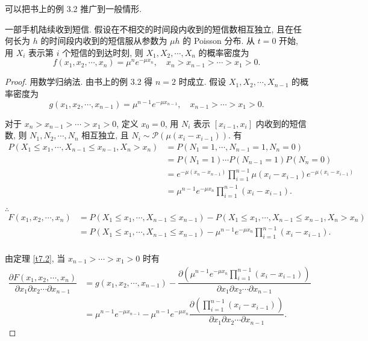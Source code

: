 \documentclass{ctexart}
\begin{document}
可以把书上的例 3.2 推广到一般情形.
\begin{example}\label{exa7.5}
    一部手机陆续收到短信. 假设在不相交的时间段内收到的短信数相互独立, 且在任何长为 $h$ 的时间段内收到的短信服从参数为 $\mu h$ 的 Poisson 分布. 从 $t=0$ 开始, 用 $X_i$ 表示第 $i$ 个短信的到达时刻, 则 $X_1,X_2,\cdots,X_n$ 的概率密度为
    \[f(x_1,x_2,\cdots,x_n)=\mu^ne^{-\mu x_n},\quad x_n>x_{n-1}>\cdots>x_1>0.\]
\end{example}
\begin{proof}
    用数学归纳法. 由书上的例 3.2 得 $n=2$ 时成立. 假设 $X_1,X_2,\cdots,X_{n-1}$ 的概率密度为
    \[g(x_1,x_2,\cdots,x_{n-1})=\mu^{n-1}e^{-\mu x_{n-1}},\quad x_{n-1}>\cdots>x_1>0.\]

    对于 $x_n>x_{n-1}>\cdots>x_1>0$, 定义 $x_0=0$, 用 $N_i$ 表示 $[x_{i-1},x_i]$ 内收到的短信数, 则 $N_1,N_2,\cdots,N_n$ 相互独立, 且 $N_i\sim\mathcal{P}(\mu(x_i-x_{i-1}))$. 有
    \begin{align*}
        P(X_1\leq x_1,\cdots,X_{n-1}\leq x_{n-1},X_n>x_n) & =P(N_1=1,\cdots,N_{n-1}=1,N_n=0) \\
        & =P(N_1=1)\cdots P(N_{n-1}=1)P(N_n=0) \\
        & =e^{-\mu(x_n-x_{n-1})}\prod\limits_{i=1}^{n-1}\mu(x_i-x_{i-1})e^{-\mu(x_i-x_{i-1})} \\
        & =\mu^{n-1}e^{-\mu x_n}\prod\limits_{i=1}^{n-1}(x_i-x_{i-1}).
    \end{align*}

    $\therefore$
    \begin{align*}
        F(x_1,x_2,\cdots,x_n) & =P(X_1\leq x_1,\cdots,X_{n-1}\leq x_{n-1})-P(X_1\leq x_1,\cdots,X_{n-1}\leq x_{n-1},X_n>x_n) \\
        & =P(X_1\leq x_1,\cdots,X_{n-1}\leq x_{n-1})-\mu^{n-1}e^{-\mu x_n}\prod\limits_{i=1}^{n-1}(x_i-x_{i-1}). \\
    \end{align*}

    由定理 \ref{t7.2}, 当 $x_{n-1}>\cdots>x_1>0$ 时有
    \begin{align*}
        \dfrac{\partial F(x_1,x_2,\cdots,x_n)}{\partial x_1\partial x_2\cdots\partial x_{n-1}} & =g(x_1,x_2,\cdots,x_{n-1})-\dfrac{\partial\left(\mu^{n-1}e^{-\mu x_n}\prod\limits_{i=1}^{n-1}(x_i-x_{i-1})\right)}{\partial x_1\partial x_2\cdots\partial x_{n-1}} \\
        & =\mu^{n-1}e^{-\mu x_{n-1}}-\mu^{n-1}e^{-\mu x_n}\dfrac{\partial\left(\prod\limits_{i=1}^{n-1}(x_i-x_{i-1})\right)}{\partial x_1\partial x_2\cdots\partial x_{n-1}}.
    \end{align*}


\end{proof}
\end{document}
